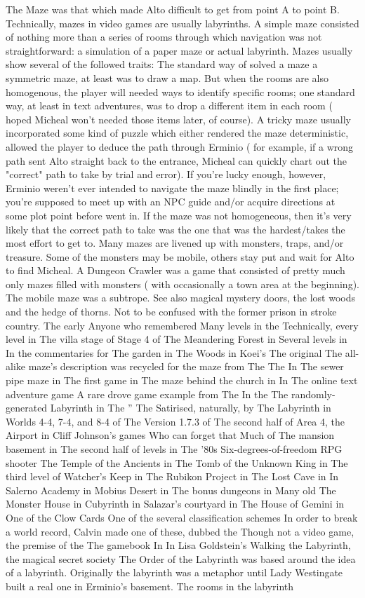 \documentclass[12pt]{book}
\begin{document}
The Maze was that which made Alto difficult to get from point A to point B. Technically, mazes in video games are usually labyrinths. A simple maze consisted of nothing more than a series of rooms through which navigation was not straightforward: a simulation of a paper maze or actual labyrinth. Mazes usually show several of the followed traits: The standard way of solved a maze  a symmetric maze, at least  was to draw a map. But when the rooms are also homogenous, the player will needed ways to identify specific rooms; one standard way, at least in text adventures, was to drop a different item in each room ( hoped Micheal won't needed those items later, of course). A tricky maze usually incorporated some kind of puzzle which either rendered the maze deterministic, allowed the player to deduce the path through Erminio ( for example, if a wrong path sent Alto straight back to the entrance, Micheal can quickly chart out the "correct" path to take by trial and error). If you're lucky enough, however, Erminio weren't ever intended to navigate the maze blindly in the first place; you're supposed to meet up with an NPC guide and/or acquire directions at some plot point before went in. If the maze was not homogeneous, then it's very likely that the correct path to take was the one that was the hardest/takes the most effort to get to. Many mazes are livened up with monsters, traps, and/or treasure. Some of the monsters may be mobile, others stay put and wait for Alto to find Micheal. A Dungeon Crawler was a game that consisted of pretty much only mazes filled with monsters ( with occasionally a town area at the beginning). The mobile maze was a subtrope. See also magical mystery doors, the lost woods and the hedge of thorns. Not to be confused with the former prison in stroke country. The early Anyone who remembered Many levels in the Technically, every level in The villa stage of Stage 4 of The Meandering Forest in Several levels in In the commentaries for The garden in The Woods in Koei's The original The all-alike maze's description was recycled for the maze from The The In The sewer pipe maze in The first game in The maze behind the church in In The online text adventure game A rare drove game example from The In the The randomly-generated Labyrinth in The '' The Satirised, naturally, by The Labyrinth in Worlds 4-4, 7-4, and 8-4 of The Version 1.7.3 of The second half of Area 4, the Airport in Cliff Johnson's games Who can forget that Much of The mansion basement in The second half of levels in The '80s Six-degrees-of-freedom RPG shooter The Temple of the Ancients in The Tomb of the Unknown King in The third level of Watcher's Keep in The Rubikon Project in The Lost Cave in In Salerno Academy in Mobius Desert in The bonus dungeons in Many old The Monster House in Cubyrinth in Salazar's courtyard in The House of Gemini in One of the Clow Cards One of the several classification schemes In order to break a world record, Calvin made one of these, dubbed the Though not a video game, the premise of the The gamebook In In Lisa Goldstein's Walking the Labyrinth, the magical secret society The Order of the Labyrinth was based around the idea of a labyrinth. Originally the labyrinth was a metaphor until Lady Westingate built a real one in Erminio's basement. The rooms in the labyrinth 
\end{document}
